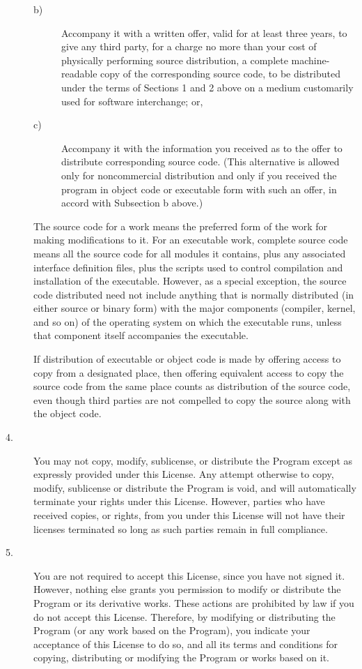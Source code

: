 \begin{description}
\begin{description}
\item[b)] Accompany  it with a  written offer, valid  for at  least three
years, to give any third party, for a charge no more than your cost of
physically performing source distribution, a complete machine-readable
copy of the corresponding source code, to be distributed under the
terms of Sections 1 and 2 above on a medium customarily used for
software interchange; or,

\item[c)] Accompany it with the information you received  as to the offer
to distribute corresponding   source code.  (This  alternative  is
allowed   only for  noncommercial   distribution  and only  if you
received the  program in object code or  executable form with such
an offer, in accord with Subsection b above.)
\end{description}

The source code for a work means the preferred form of the work for
making modifications to it.  For an executable work, complete source
code means all the source code for all modules it contains, plus any
associated interface definition files, plus the scripts used to
control compilation and installation of the executable.  However, as a
special exception, the source code distributed need not include
anything that is normally distributed (in either source or binary
form) with the major components (compiler, kernel, and so on) of the
operating system on which the executable runs, unless that component
itself accompanies the executable.

If distribution of executable or object code is made by offering
access to copy from a designated place, then offering equivalent
access to copy the source code from the same place counts as
distribution of the source code, even though third parties are not
compelled to copy the source along with the object code.

\item[4.] You  may not copy, modify,  sublicense, or distribute the Program
except as expressly provided under this License.  Any attempt
otherwise to copy, modify, sublicense or distribute the Program is
void, and will automatically terminate your rights under this License.
However, parties who have received copies, or rights, from you under
this License will not have their licenses terminated so long as such
parties remain in full compliance.

\item[5.] You are not required to accept this License, since you have not
signed it.  However, nothing else grants you permission to modify or
distribute the Program or its derivative works.  These actions are
prohibited by law if you do not accept this License.  Therefore, by
modifying or distributing the Program (or any work based on the
Program), you indicate your acceptance of this License to do so, and
all its terms and conditions for copying, distributing or modifying
the Program or works based on it.


\end{description}
